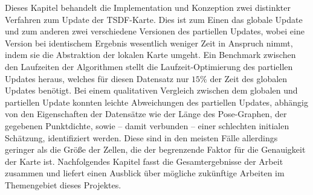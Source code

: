 Dieses Kapitel behandelt die Implementation und Konzeption zwei distinkter Verfahren zum Update der TSDF-Karte. Dies ist zum Einen das globale Update und zum anderen zwei verschiedene Versionen des partiellen Updates, wobei eine Version bei identischem Ergebnis wesentlich weniger Zeit in Anspruch nimmt, indem sie die Abstraktion der lokalen Karte umgeht. Ein Benchmark zwischen den Laufzeiten der Algorithmen stellt die Laufzeit-Optimierung des partiellen Updates heraus, welches für diesen Datensatz nur $15\%$ der Zeit des globalen Updates benötigt. Bei einem qualitativen Vergleich zwischen  dem globalen und partiellen Update konnten leichte Abweichungen des partiellen Updates, abhängig von den Eigenschaften der Datensätze wie der Länge des Pose-Graphen, der gegebenen Punktdichte, sowie -- damit verbunden -- einer schlechten initialen Schätzung, identifiziert werden. Diese sind in den meisten Fälle allerdings geringer als die Größe der Zellen, die der begrenzende Faktor für die Genauigkeit der Karte ist.
Nachfolgendes Kapitel fasst die Gesamtergebnisse der Arbeit zusammen und liefert einen Ausblick über mögliche zukünftige Arbeiten im Themengebiet dieses Projektes.


